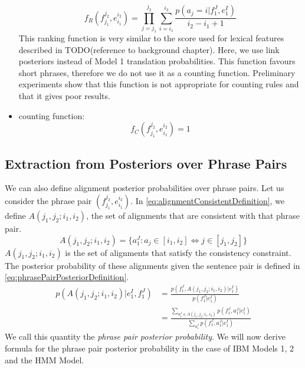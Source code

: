 \begin{itemize}
%
\begin{equation} \label{eq:linkPosRanking}
  f_R(f_{j_1}^{j_2},e_{i_1}^{i_2}) = \prod_{j=j_1}^{j_2} \sum_{i=i_1}^{i_2} \frac{p(a_j = i|f_1^J,e_1^I)}{i_2-i_1+1}
\end{equation}
%
This ranking function is very similar to the score used for lexical features
described in TODO(reference to background chapter). Here,
we use link posteriors instead of Model 1 translation probabilities. This
function favours short phrases, therefore we do not use it as a counting
function. Preliminary experiments show that this function is not appropriate for
counting rules and that it gives poor results.
  \item counting function:
%
\begin{equation}
  f_C(f_{j_1}^{j_2},e_{i_1}^{i_2}) = 1
\end{equation}
%
\end{itemize}

\subsection{Extraction from Posteriors over Phrase Pairs}
\label{sec:extractionFromPosteriorsPhrasePair}

We can also define alignment posterior probabilities over phrase pairs. Let us
consider the phrase pair $(f_{j_1}^{j_2}, e_{i_1}^{i_2})$. In
\autoref{eq:alignmentConsistentDefinition}, we define
$A(j_1, j_2; i_1, i_2)$, the set of alignments that are consistent with that
phrase pair.
%
\begin{equation}
  A(j_1, j_2;i_1, i_2) = \{a_1^J : a_j \in [i_1, i_2] \Leftrightarrow j \in [j_1,j_2] \}
  \label{eq:alignmentConsistentDefinition}
\end{equation}
%
$A(j_1, j_2;i_1, i_2)$ is the set of alignments that satisfy the consistency
constraint. The posterior probability of these alignments given the sentence
pair is defined
in \autoref{eq:phrasePairPosteriorDefinition}.
%
\begin{equation}
  \begin{split}
  p(A(j_1, j_2; i_1, i_2) | e_1^I, f_1^J) &= \frac{p(f_1^J, A(j_1, j_2; i_1, i_2)| e_1^I)}{p(f_1^J | e_1^I)} \\
                                          &= \frac{\sum_{a_1^J \in A(j_1, j_2; i_1, i_2)} p(f_1^J,a_1^J| e_1^I)}{\sum_{a_1^J} p(f_1^J,a_1^J|e_1^I)}
  \end{split}
  \label{eq:phrasePairPosteriorDefinition}
\end{equation}
%
We call this quantity the \emph{phrase pair posterior probability}.
We will now derive formula for the phrase pair posterior probability in the
case of IBM Models 1, 2 and the HMM Model.

